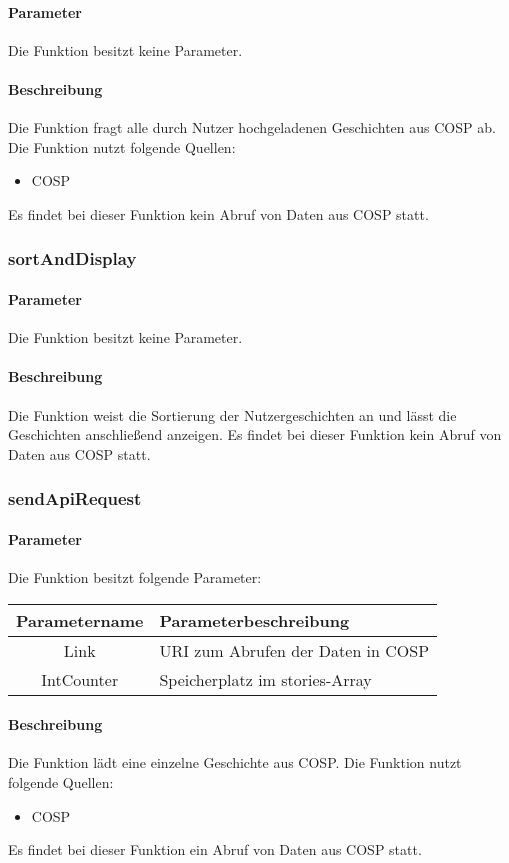 \paragraph{Parameter} Die Funktion besitzt keine Parameter.
\paragraph{Beschreibung} Die Funktion fragt alle durch Nutzer hochgeladenen Geschichten aus {\glqq COSP\grqq} ab. Die Funktion nutzt folgende Quellen:
\begin{itemize}
	\item COSP
\end{itemize}
Es findet bei dieser Funktion kein Abruf von Daten aus {\glqq COSP\grqq} statt.
\subsubsection{sortAndDisplay}
\paragraph{Parameter} Die Funktion besitzt keine Parameter.
\paragraph{Beschreibung} Die Funktion weist die Sortierung der Nutzergeschichten an und lässt die Geschichten anschließend anzeigen. Es findet bei dieser Funktion kein Abruf von Daten aus {\glqq COSP\grqq} statt.
\subsubsection{sendApiRequest}
\paragraph{Parameter} Die Funktion besitzt folgende Parameter:
\begin{table}[H]
	\begin{tabular}{|c|p{11cm}|}
		\hline
		\textbf{Parametername} & \textbf{Parameterbeschreibung} \\ \hline
		Link       & URI zum Abrufen der Daten in {\glqq COSP\grqq} \\ \hline
		IntCounter & Speicherplatz im {\glqq stories\grqq}-Array \\ \hline
	\end{tabular}
\end{table}
\paragraph{Beschreibung} Die Funktion lädt eine einzelne Geschichte aus {\glqq COSP\grqq}. Die Funktion nutzt folgende Quellen:
\begin{itemize}
	\item COSP
\end{itemize}
Es findet bei dieser Funktion ein Abruf von Daten aus {\glqq COSP\grqq} statt.
